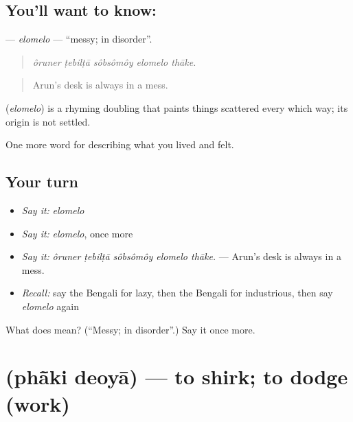 \subsection*{You'll want to know: }
\textbf{} — \emph{elomelo} — \textquotedblleft{}messy; in disorder\textquotedblright{}.

\begin{quote}
    
\end{quote}

\begin{quote}
\emph{ôruner ṭebilṭā sôbsômôy elomelo thāke.}
\end{quote}

\begin{quote}
Arun's desk is always in a mess.
\end{quote}

\begin{cousinweb}
\textbf{} (\emph{elomelo}) is a rhyming doubling that paints things scattered every which way; its origin is not settled.
\end{cousinweb}

\begin{grammarlens}[title={What you've built}]
One more word for describing what you lived and felt.
\end{grammarlens}

\subsection*{Your turn}
\begin{itemize}
\raggedright
  \item \emph{Say it:} \emph{elomelo}
  \item \emph{Say it:} \emph{elomelo}, once more
  \item \emph{Say it:} \emph{ôruner ṭebilṭā sôbsômôy elomelo thāke.} — Arun's desk is always in a mess.
  \item \emph{Recall:} say the Bengali for lazy, then the Bengali for industrious, then say \emph{elomelo} again
\end{itemize}

\begin{tcolorbox}[breakable,colback=teal!4,colframe=teal!35!black,title={Before you move on}]
What does  mean? (\textquotedblleft{}Messy; in disorder\textquotedblright{}.) Say it once more.
\end{tcolorbox}
\section[\texorpdfstring{\bn{ফাঁকি} \bn{দেওয়া} (phā̃ki deoyā)}{ফাঁকি দেওয়া (phā̃ki deoyā)}]{  (phā̃ki deoyā) — to shirk; to dodge (work)}


